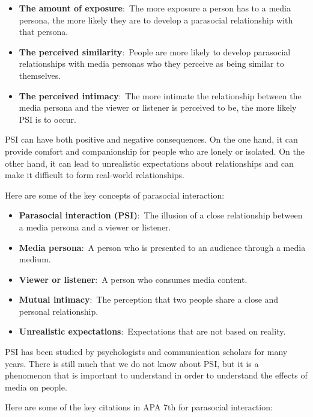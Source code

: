\documentclass[
  b5paper]{book}
\begin{document}
\begin{itemize}
\item
  \textbf{The amount of exposure}:~The more exposure a person has to a media persona, the more likely they are to develop a parasocial relationship with that persona.
\item
  \textbf{The perceived similarity}:~People are more likely to develop parasocial relationships with media personas who they perceive as being similar to themselves.
\item
  \textbf{The perceived intimacy}:~The more intimate the relationship between the media persona and the viewer or listener is perceived to be, the more likely PSI is to occur.
\end{itemize}

PSI can have both positive and negative consequences. On the one hand, it can provide comfort and companionship for people who are lonely or isolated. On the other hand, it can lead to unrealistic expectations about relationships and can make it difficult to form real-world relationships.

Here are some of the key concepts of parasocial interaction:

\begin{itemize}
\item
  \textbf{Parasocial interaction (PSI)}:~The illusion of a close relationship between a media persona and a viewer or listener.
\item
  \textbf{Media persona}:~A person who is presented to an audience through a media medium.
\item
  \textbf{Viewer or listener}:~A person who consumes media content.
\item
  \textbf{Mutual intimacy}:~The perception that two people share a close and personal relationship.
\item
  \textbf{Unrealistic expectations}:~Expectations that are not based on reality.
\end{itemize}

PSI has been studied by psychologists and communication scholars for many years. There is still much that we do not know about PSI, but it is a phenomenon that is important to understand in order to understand the effects of media on people.

Here are some of the key citations in APA 7th for parasocial interaction:
\end{document}
